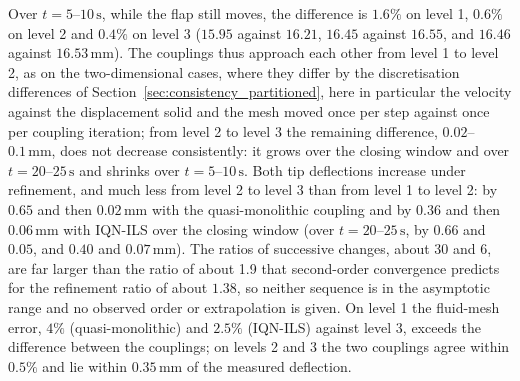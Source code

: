 Over $t = 5$--$10\,\mathrm{s}$, while the flap still moves, the difference is $1.6\%$ on level 1, $0.6\%$ on level 2 and $0.4\%$ on level 3 ($15.95$ against $16.21$, $16.45$ against $16.55$, and $16.46$ against $16.53\,\mathrm{mm}$).
The couplings thus approach each other from level 1 to level 2, as on the two-dimensional cases, where they differ by the discretisation differences of Section~\ref{sec:consistency_partitioned}, here in particular the velocity against the displacement solid and the mesh moved once per step against once per coupling iteration; from level 2 to level 3 the remaining difference, $0.02$--$0.1\,\mathrm{mm}$, does not decrease consistently: it grows over the closing window and over $t = 20$--$25\,\mathrm{s}$ and shrinks over $t = 5$--$10\,\mathrm{s}$.
Both tip deflections increase under refinement, and much less from level 2 to level 3 than from level 1 to level 2: by $0.65$ and then $0.02\,\mathrm{mm}$ with the quasi-monolithic coupling and by $0.36$ and then $0.06\,\mathrm{mm}$ with IQN-ILS over the closing window (over $t = 20$--$25\,\mathrm{s}$, by $0.66$ and $0.05$, and $0.40$ and $0.07\,\mathrm{mm}$).
The ratios of successive changes, about 30 and 6, are far larger than the ratio of about 1.9 that second-order convergence predicts for the refinement ratio of about $1.38$, so neither sequence is in the asymptotic range and no observed order or extrapolation is given.
On level 1 the fluid-mesh error, $4\%$ (quasi-monolithic) and $2.5\%$ (IQN-ILS) against level 3, exceeds the difference between the couplings; on levels 2 and 3 the two couplings agree within $0.5\%$ and lie within $0.35\,\mathrm{mm}$ of the measured deflection.

